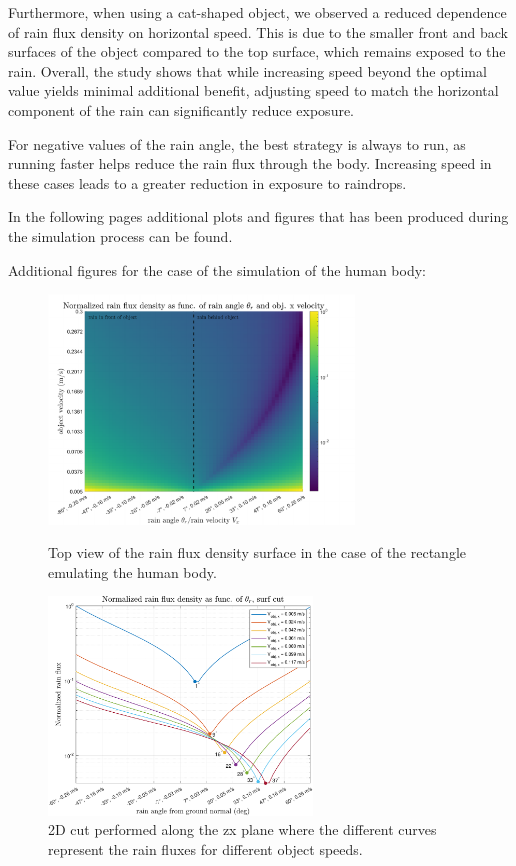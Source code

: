 \documentclass[12pt]{report}
\begin{document}
            Furthermore, when using a cat-shaped object, we observed a reduced dependence of rain flux density on horizontal speed. This is due to the smaller front and back surfaces of the object compared to the top surface, which remains exposed to the rain. Overall, the study shows that while increasing speed beyond the optimal value yields minimal additional benefit, adjusting speed to match the horizontal component of the rain can significantly reduce exposure.

            For negative values of the rain angle, the best strategy is always to run, as running faster helps reduce the rain flux through the body. Increasing speed in these cases leads to a greater reduction in exposure to raindrops.

            In the following pages additional plots and figures that has been produced during the simulation process can be found.

            \newpage
            Additional figures for the case of the simulation of the human body:
            \vspace{-10pt}
            \begin{figure}[H]
                \centering
                \includegraphics[width=0.725\textwidth]{images/human/rain_flux_surf_2D.pdf}
                \caption{Top view of the rain flux density surface in the case of the rectangle emulating the human body.}
                \hspace{-35pt}
                \includegraphics[width=0.625\textwidth]{images/human/rain_flux_theta_min.pdf}
                \caption{2D cut performed along the zx plane where the different curves represent the rain fluxes for different object speeds.}
            \end{figure}
\end{document}
